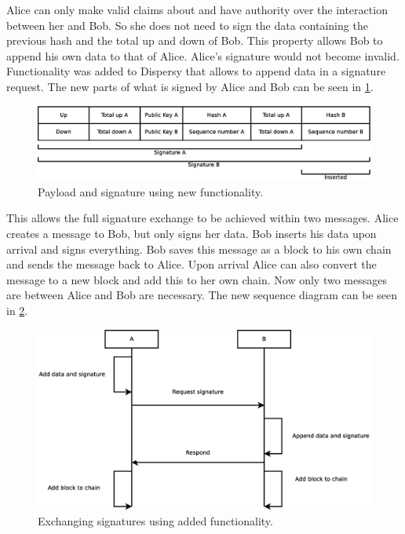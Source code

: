 Alice can only make valid claims about and have authority over the interaction between her and Bob.
So she does not need to sign the data containing the previous hash and the total up and down of Bob.
This property allows Bob to append his own data to that of Alice.
Alice's signature would not become invalid.
Functionality was added to Dispersy that allows to append data in a signature request.
The new parts of what is signed by Alice and Bob can be seen in \ref{fig:payload-signature-new}.

\begin{figure}
	\centerline{\includegraphics[scale=0.3]{design/figs/signature_new.eps}}
	\caption{Payload and signature using new functionality.}
	\label{fig:payload-signature-new}
\end{figure}

This allows the full signature exchange to be achieved within two messages.
Alice creates a message to Bob, but only signs her data.
Bob inserts his data upon arrival and signs everything.
Bob saves this message as a block to his own chain
and sends the message back to Alice.
Upon arrival Alice can also convert the message to a new block and add this to her own chain.
Now only two messages are between Alice and Bob are necessary.
The new sequence diagram can be seen in \ref{fig:exchange-new-sequence}.

\begin{figure}
	\centerline{\includegraphics[scale=0.3]{design/figs/exchange_new.eps}}
	\caption{Exchanging signatures using added functionality.}
	\label{fig:exchange-new-sequence}
\end{figure}

